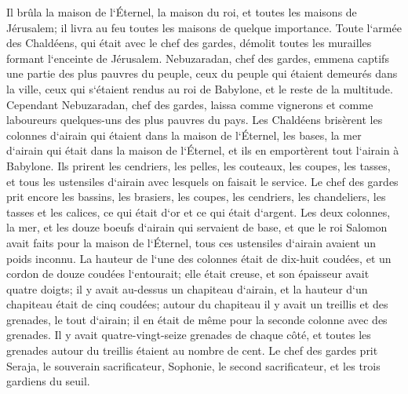 \verse Il brûla la maison de l`Éternel, la maison du roi, et toutes les maisons de Jérusalem; il livra au feu toutes les maisons de quelque importance. 
\verse Toute l`armée des Chaldéens, qui était avec le chef des gardes, démolit toutes les murailles formant l`enceinte de Jérusalem. 
\verse Nebuzaradan, chef des gardes, emmena captifs une partie des plus pauvres du peuple, ceux du peuple qui étaient demeurés dans la ville, ceux qui s`étaient rendus au roi de Babylone, et le reste de la multitude. 
\verse Cependant Nebuzaradan, chef des gardes, laissa comme vignerons et comme laboureurs quelques-uns des plus pauvres du pays. 
\verse Les Chaldéens brisèrent les colonnes d`airain qui étaient dans la maison de l`Éternel, les bases, la mer d`airain qui était dans la maison de l`Éternel, et ils en emportèrent tout l`airain à Babylone. 
\verse Ils prirent les cendriers, les pelles, les couteaux, les coupes, les tasses, et tous les ustensiles d`airain avec lesquels on faisait le service. 
\verse Le chef des gardes prit encore les bassins, les brasiers, les coupes, les cendriers, les chandeliers, les tasses et les calices, ce qui était d`or et ce qui était d`argent. 
\verse Les deux colonnes, la mer, et les douze boeufs d`airain qui servaient de base, et que le roi Salomon avait faits pour la maison de l`Éternel, tous ces ustensiles d`airain avaient un poids inconnu. 
\verse La hauteur de l`une des colonnes était de dix-huit coudées, et un cordon de douze coudées l`entourait; elle était creuse, et son épaisseur avait quatre doigts; 
\verse il y avait au-dessus un chapiteau d`airain, et la hauteur d`un chapiteau était de cinq coudées; autour du chapiteau il y avait un treillis et des grenades, le tout d`airain; il en était de même pour la seconde colonne avec des grenades. 
\verse Il y avait quatre-vingt-seize grenades de chaque côté, et toutes les grenades autour du treillis étaient au nombre de cent. 
\verse Le chef des gardes prit Seraja, le souverain sacrificateur, Sophonie, le second sacrificateur, et les trois gardiens du seuil. 

